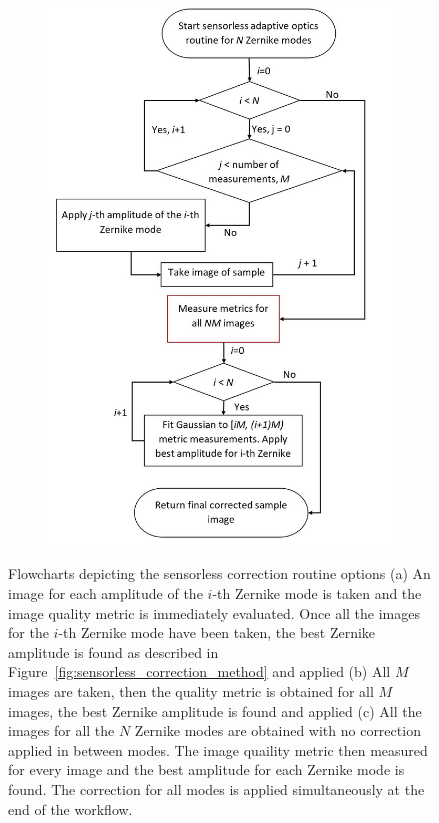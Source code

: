 \begin{figure}[h]
	\centering
	\begin{subfigure}{0.425\textwidth}
		\includegraphics[scale=0.55]{./images/sensorless_correction_workflow_3.jpg}
		\caption{}
		\label{fig:sensorless_correction_workflow_3}
	\end{subfigure}
	\caption{Flowcharts depicting the sensorless correction routine options (a) An image for each amplitude of the $i$-th Zernike mode is taken and the image quality metric is immediately evaluated. Once all the images for the $i$-th Zernike mode have been taken, the best Zernike amplitude is found as described in Figure~\ref{fig:sensorless_correction_method} and applied (b) All $M$ images are taken, then the quality metric is obtained for all $M$ images, the best Zernike amplitude is found and applied (c) All the images for all the $N$ Zernike modes are obtained with no correction applied in between modes. The image quaility metric then measured for every image and the best amplitude for each Zernike mode is found. The correction for all modes is applied simultaneously at the end of the workflow.}
	\label{fig:sensorless_correction_workflows}
\end{figure}

